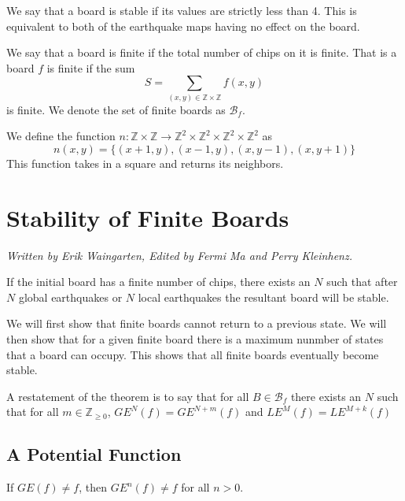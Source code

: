 \documentclass[runningheads,a4paper]{llncs}
\begin{document}
\begin{definition}
We say that a board is stable if its values are strictly less than 4. This is equivalent to both of the earthquake maps having no effect on the board. 
\end{definition}

\begin{definition} 
We say that a board is finite if the total number of chips on it is finite. That is a board $f$ is finite if the sum
\begin{equation}
S= \sum_{(x,y) \in \mathbb{Z} \times \mathbb{Z}} f(x,y) 
\end{equation}
is finite. 
We denote the set of finite boards as $\mathcal{B}_f$.
\end{definition}

\begin{definition}
We define the function $n: \mathbb{Z} \times \mathbb{Z} \rightarrow \mathbb{Z}^2 \times \mathbb{Z}^2 \times \mathbb{Z}^2 \times \mathbb{Z}^2 $ as 
\begin{equation}
n(x,y) = \{ (x+1, y), (x-1, y), (x, y-1), (x, y+1) \}
\end{equation}
This function takes in a square and returns its neighbors. 
\end{definition}

\section{Stability of Finite Boards}
\label{Stability of Finite Boards}
\emph{Written by Erik Waingarten, Edited by Fermi Ma and Perry Kleinhenz.}

\begin{theorem}
\label{finitestability}
If the initial board has a finite number of chips, there exists an $N$ such that after $N$ global earthquakes or $N$ local earthquakes the resultant board will be stable.
\end{theorem}

We will first show that finite boards cannot return to a previous state. We will then show that for a given finite board there is a maximum nunmber of states that a board can occupy. This shows that all finite boards eventually become stable.

A restatement of the theorem is to say that for all $B \in \mathcal{B}_f$ there exists an $N$ such that for all $m \in \mathbb{Z}_{\geq 0}$, $GE^N(f) = GE^{N+m}(f)$ and $LE^{M}(f) = LE^{M+k}(f)$

\subsection{A Potential Function}
\begin{lemma}
If $GE(f) \neq f$, then $GE^n(f) \neq f$ for all $n > 0$.
\end{lemma}
\end{document}
